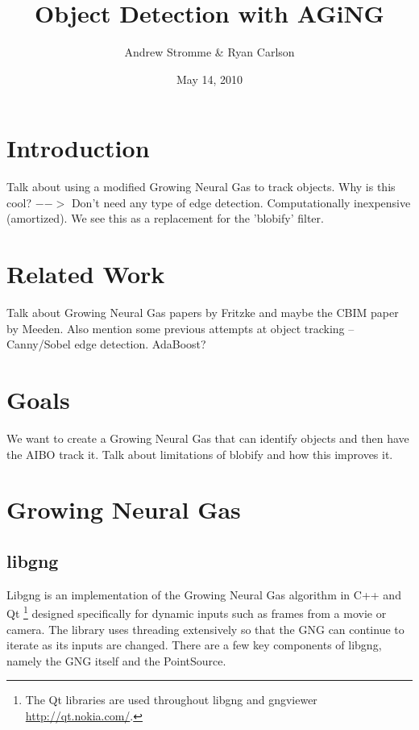 \documentclass{article}
\renewcommand{\|}{\origbar} %
\begin{document}
\title{Object Detection with AGiNG}
\author{Andrew Stromme \& Ryan Carlson}
\date{May 14, 2010}
\maketitle

\begin{abstract}
\end{abstract}

\section{Introduction}

Talk about using a modified Growing Neural Gas to track objects. Why is this cool? $-->$ Don't need any type of edge detection. Computationally inexpensive (amortized). We see this as a replacement for the 'blobify' filter.

\section{Related Work}

Talk about Growing Neural Gas papers by Fritzke and maybe the CBIM paper by Meeden. Also mention some previous attempts at object tracking -- Canny/Sobel edge detection. AdaBoost?

\section{Goals}

We want to create a Growing Neural Gas that can identify objects and then have the AIBO track it. Talk about limitations of blobify and how this improves it.

\section{Growing Neural Gas}

\subsection{libgng}

Libgng is an implementation of the Growing Neural Gas algorithm in C++ and Qt \footnote{The Qt libraries are used throughout libgng and gngviewer \url{http://qt.nokia.com/}.} designed specifically for dynamic inputs such as frames from a movie or camera. The library uses threading extensively so that the GNG can continue to iterate as its inputs are changed. There are a few key components of libgng, namely the GNG itself and the PointSource.
\end{document}
